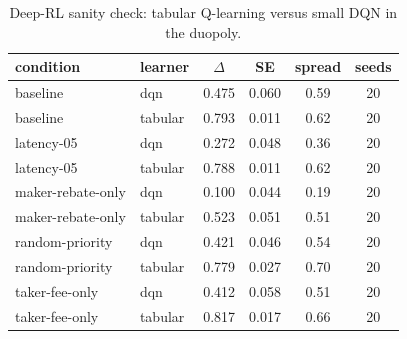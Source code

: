 \begin{table}[t]
\caption{Deep-RL sanity check: tabular Q-learning versus small DQN in the duopoly.}
\label{tab:deep-sanity}
\small
\begin{tabular}{@{}llcccc@{}}
\toprule
condition & learner & $\Delta$ & SE & spread & seeds \\
\midrule
baseline & dqn & 0.475 & 0.060 & 0.59 & 20 \\
baseline & tabular & 0.793 & 0.011 & 0.62 & 20 \\
latency-05 & dqn & 0.272 & 0.048 & 0.36 & 20 \\
latency-05 & tabular & 0.788 & 0.011 & 0.62 & 20 \\
maker-rebate-only & dqn & 0.100 & 0.044 & 0.19 & 20 \\
maker-rebate-only & tabular & 0.523 & 0.051 & 0.51 & 20 \\
random-priority & dqn & 0.421 & 0.046 & 0.54 & 20 \\
random-priority & tabular & 0.779 & 0.027 & 0.70 & 20 \\
taker-fee-only & dqn & 0.412 & 0.058 & 0.51 & 20 \\
taker-fee-only & tabular & 0.817 & 0.017 & 0.66 & 20 \\
\bottomrule
\end{tabular}
\end{table}
